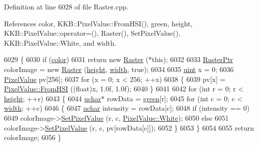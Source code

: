 Definition at line 6028 of file Raster.\+cpp.



References color, K\+K\+B\+::\+Pixel\+Value\+::\+From\+H\+S\+I(), green, height, K\+K\+B\+::\+Pixel\+Value\+::operator=(), Raster(), Set\+Pixel\+Value(), K\+K\+B\+::\+Pixel\+Value\+::\+White, and width.


\begin{DoxyCode}
6029 \{
6030   \textcolor{keywordflow}{if}  (\hyperlink{class_k_k_b_1_1_raster_a482384d89cc53fa4f36276307c746854}{color})
6031     \textcolor{keywordflow}{return} \textcolor{keyword}{new} \hyperlink{class_k_k_b_1_1_raster_a19ec88efff547c1fcda863172fef620b}{Raster} (*\textcolor{keyword}{this});
6032 
6033   \hyperlink{class_k_k_b_1_1_raster}{RasterPtr}  colorImage = \textcolor{keyword}{new} \hyperlink{class_k_k_b_1_1_raster_a19ec88efff547c1fcda863172fef620b}{Raster} (\hyperlink{class_k_k_b_1_1_raster_af39ff189de4fbb6de98392e187efafb7}{height}, \hyperlink{class_k_k_b_1_1_raster_ae0bcc103e191c3421d7692dc69ceb554}{width}, \textcolor{keyword}{true});
6034 
6035   \hyperlink{namespace_k_k_b_ab8557ae1b1f2361659d82a890e2f8014}{uint}  x = 0;
6036   \hyperlink{class_k_k_b_1_1_pixel_value}{PixelValue}  pv[256];
6037   \textcolor{keywordflow}{for}  (x = 0;  x < 256;  ++x)
6038   \{
6039     pv[x] = \hyperlink{class_k_k_b_1_1_pixel_value_a1aed38456fe38d925a5fdeb25d94cd6f}{PixelValue::FromHSI} ((\textcolor{keywordtype}{float})x, 1.0f, 1.0f);
6040   \}
6041 
6042   \textcolor{keywordflow}{for}  (\textcolor{keywordtype}{int} r = 0;  r < \hyperlink{class_k_k_b_1_1_raster_af39ff189de4fbb6de98392e187efafb7}{height};  ++r)
6043   \{
6044     \hyperlink{namespace_k_k_b_ace9969169bf514f9ee6185186949cdf7}{uchar}*  rowData = \hyperlink{class_k_k_b_1_1_raster_a2d2238911145488e226cd2e34fc8448c}{green}[r];
6045     \textcolor{keywordflow}{for}  (\textcolor{keywordtype}{int} c = 0;  c < \hyperlink{class_k_k_b_1_1_raster_ae0bcc103e191c3421d7692dc69ceb554}{width};  ++c)
6046     \{
6047       \hyperlink{namespace_k_k_b_ace9969169bf514f9ee6185186949cdf7}{uchar}  intensity = rowData[c];
6048       \textcolor{keywordflow}{if}  (intensity == 0)
6049         colorImage->\hyperlink{class_k_k_b_1_1_raster_a5ddb8bd069dc64241941b0b011af8667}{SetPixelValue} (r, c, \hyperlink{class_k_k_b_1_1_pixel_value_acc6b911dd3a96eb1dc6eb0baf42047ed}{PixelValue::White});
6050       \textcolor{keywordflow}{else}
6051         colorImage->\hyperlink{class_k_k_b_1_1_raster_a5ddb8bd069dc64241941b0b011af8667}{SetPixelValue} (r, c, pv[rowData[c]]);
6052     \}
6053   \}
6054 
6055   \textcolor{keywordflow}{return}   colorImage;
6056 \}
\end{DoxyCode}
